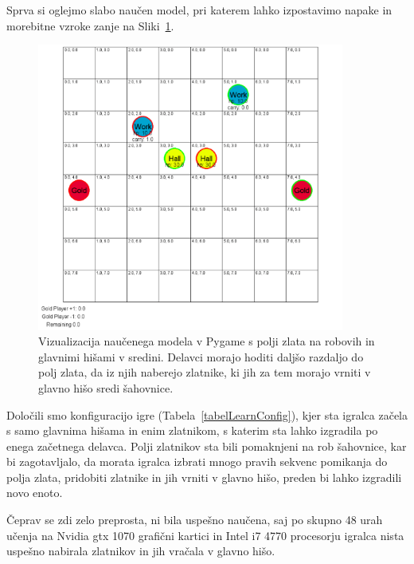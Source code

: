 \documentclass[a4paper, 12pt]{book}
\begin{document}
{Sprva si oglejmo slabo naučen model, pri katerem lahko izpostavimo napake in morebitne vzroke zanje na Sliki~\ref{vizualizacijaRezultatovSpremembaZlata}.
\begin{figure}[h!]
	\begin{center}
		\includegraphics[width=0.9\textwidth]{photos/third-2018-11-14.pdf}
	\end{center}
	\caption{Vizualizacija naučenega modela v Pygame s polji zlata na robovih in glavnimi hišami v sredini. Delavci morajo hoditi daljšo razdaljo do polj zlata, da iz njih naberejo zlatnike, ki jih za tem morajo vrniti v glavno hišo sredi šahovnice. }
	\label{vizualizacijaRezultatovSpremembaZlata}
\end{figure}

Določili smo konfiguracijo igre (Tabela~\ref{tabelLearnConfig}), kjer sta igralca začela s samo glavnima hišama in enim zlatnikom, s katerim sta lahko izgradila po enega začetnega delavca.
Polji zlatnikov sta bili pomaknjeni na rob šahovnice, kar bi zagotavljalo, da morata igralca izbrati mnogo pravih sekvenc pomikanja do polja zlata, pridobiti zlatnike in jih vrniti v glavno hišo, preden bi lahko izgradili novo enoto.

Čeprav se zdi zelo preprosta, ni bila uspešno naučena, saj po skupno 48 urah učenja na Nvidia gtx 1070 grafični kartici in Intel i7 4770 procesorju igralca nista uspešno nabirala zlatnikov in jih vračala v glavno hišo.\\

}
\end{document}
